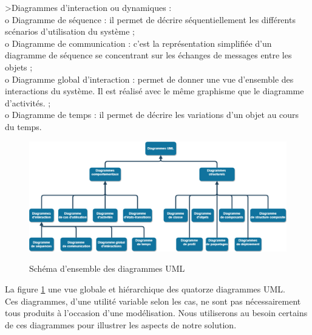 \textgreater Diagrammes d’interaction ou dynamiques : \\
o Diagramme de séquence : il permet de décrire séquentiellement les différents scénarios d’utilisation du système ; \\
o Diagramme de communication : c’est la représentation simplifiée d'un diagramme de séquence se concentrant sur les échanges de messages entre les objets ; \\
o Diagramme global d'interaction : permet de donner une vue d’ensemble des interactions du système. Il est réalisé avec le même graphisme que le diagramme d’activités. ; \\
o Diagramme de temps : il permet de décrire les variations d'un objet au cours du temps. \\
\begin{figure}[h!]
	\centering
	\begin{minipage}{18cm}
		\centering
		{\includegraphics[height=0.27\textheight]{fig/Uml-Diagrams-overview.png}}
	\end{minipage}
	\caption{Schéma d'ensemble des diagrammes UML}
	\label{fig:7.1}
\end{figure}
La figure \ref{fig:7.1} une vue globale et hiérarchique des quatorze diagrammes UML.\\
Ces diagrammes, d'une utilité variable selon les cas, ne sont pas nécessairement tous produits à l'occasion d'une modélisation. Nous utiliserons au besoin certains de ces diagrammes pour illustrer les aspects de notre solution.

\clearpage 

